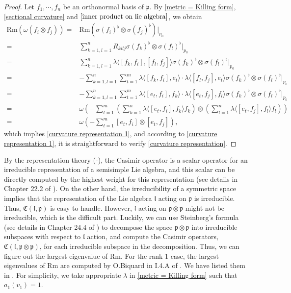 \documentclass[12pt]{amsart}
\begin{document}
\begin{proof}
    Let $f_1, \cdots, f_n$ be an orthonormal basis of $\mathfrak{p}$.  By \eqref{metric = Killing form}, \eqref{sectional curvature} and $\eqref{inner product on lie algebra}$, we obtain 
    \begin{align*}
        \mathrm{Rm}(\omega(f_i \otimes f_j)) =&
        \mathrm{Rm} \left( \sigma(f_i)^{\flat} \otimes \sigma(f_j)^{\flat} \right)\Big|_{p_0}\\
        =& \sum_{k = 1, l = 1}^{n} R_{kilj} \sigma(f_k)^{\flat} \otimes \sigma(f_l)^{\flat}\Big|_{p_0}\\
        =& \sum_{k = 1, l = 1}^{n} \lambda\langle [f_k, f_i], [f_l, f_j] \rangle \sigma(f_k)^{\flat} \otimes \sigma(f_l)^{\flat}\Big|_{p_0}\\
        =& -\sum_{k = 1, l = 1}^{n}\sum_{t = 1}^{m} \lambda\langle [f_k, f_i], e_t \rangle \cdot \lambda\langle [f_l, f_j], e_t \rangle \sigma(f_k)^{\flat} \otimes \sigma(f_l)^{\flat}\Big|_{p_0}\\
        =& -\sum_{k = 1, l = 1}^{n}\sum_{t = 1}^{m} \lambda\langle [e_t, f_i], f_k \rangle \cdot \lambda\langle [e_t, f_j], f_l \rangle \sigma(f_k)^{\flat} \otimes \sigma(f_l)^{\flat}\Big|_{p_0}\\
        =& \omega \left( -\sum_{t = 1}^{m} \left(\sum_{k = 1}^{n} \lambda\langle [e_t, f_i], f_k \rangle f_k \right) \otimes \left( \sum_{l = 1}^{n} \lambda\langle [e_t, f_j], f_l \rangle f_l \right) \right)\\
        =& \omega \left( -\sum_{t = 1}^{m}[e_t, f_i] \otimes [e_t, f_j] \right),
    \end{align*}
    which implies \eqref{curvature representation 1}, and according to \eqref{curvature representation 1}, it is straightforward to verify \eqref{curvature representation}. 
\end{proof}
By the representation theory (\cite{Bi2006}-\cite{FH2013}), the Casimir operator is a scalar operator for an irreducible representation of a semisimple Lie algebra, and this scalar can be directly computed by the highest weight for this representation (see details in Chapter 22.2 of \cite{Hu2012}). On the other hand, the irreducibility of a symmetric space implies that the representation of the Lie algebra $\mathfrak{l}$ acting on $\mathfrak{p}$ is irreducible. Thus, $\mathfrak{C}(\mathfrak{l}, \mathfrak{p})$ is easy to handle. However, $\mathfrak{l}$ acting on $\mathfrak{p}\otimes \mathfrak{p}$ might not be irreducible, which is the difficult part. Luckily, we can use Steinberg's formula (see details in Chapter 24.4 of \cite{Hu2012}) to decompose the space $\mathfrak{p}\otimes \mathfrak{p}$ into irreducible subspaces with respect to $\mathfrak{l}$ action, and compute the Casimir operators, $\mathfrak{C}(\mathfrak{l}, \mathfrak{p} \otimes \mathfrak{p})$, for each irreducible subspace in the decomposition. Thus, we can figure out the largest eigenvalue of $\mathrm{Rm}$. For the rank 1 case, the largest eigenvalues of $\mathrm{Rm}$ are computed by O.Biquard in I.4.A of \cite{Bi2006}. We have listed them in . For simplicity, we take appropriate $\lambda$ in \eqref{metric = Killing form} such that $a_1(v_1) = 1$. 
\end{document}

